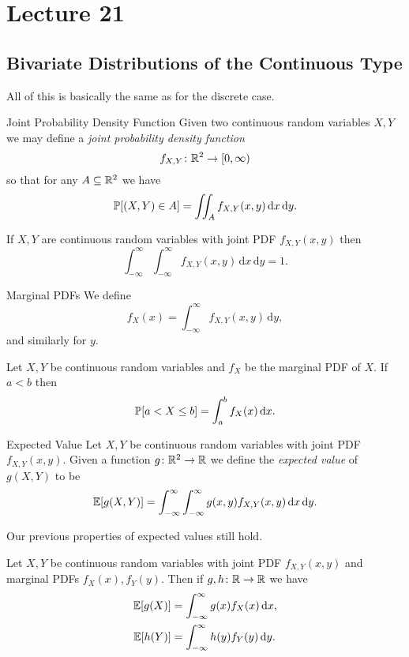 \documentclass[class=article, crop=false]{standalone}
\begin{document}
  \section{Lecture 21}
  \subsection{Bivariate Distributions of the Continuous Type}
  All of this is basically the same as for the discrete case.
  \begin{definition}{Joint Probability Density Function}
    Given two continuous random variables $X, Y$ we may define a \emph{joint probability density function}
    \[
      f_{X, Y}\colon \R^2\to [0, \infty)
    \]
    so that for any $A\sse \R^2$ we have
    \[
      \P[(X, Y)\in A] = \iint_A f_{X, Y}(x, y)\,\mathrm{d}x\,\mathrm{d}y.
    \]
  \end{definition}
  \begin{theorem}{}
    If $X, Y$ are continuous random variables with joint PDF $f_{X, Y}(x, y)$ then
    \[
      \int_{-\infty}^{\infty} \int_{-\infty}^{\infty} f_{X, Y}(x, y) \,\mathrm dx \,\mathrm dy = 1.
    \]
  \end{theorem}
  \begin{definition}{Marginal PDFs}
    We define
    \[
      f_X(x) = \int_{-\infty}^{\infty}f_{X, Y}(x, y) \,\mathrm dy,
    \]
    and similarly for $y$.
  \end{definition}
  \begin{theorem}{}
    Let $X, Y$ be continuous random variables and $f_X$ be the marginal PDF of $X$. If $a < b$ then
    \[
      \P[a < X \leq b] = \int_{a}^{b}f_X(x) \,\mathrm dx.
    \]
  \end{theorem}
  \begin{definition}{Expected Value}
    Let $X, Y$ be continuous random variables with joint PDF $f_{X, Y}(x, y)$. Given a function $g\colon \R^2\to \R$ we define the \emph{expected value} of $g(X, Y)$ to be
    \[
      \E[g(X, Y)] = \int_{-\infty}^{\infty} \int_{-\infty}^{\infty} g(x, y)f_{X, Y}(x, y) \,\mathrm dx \,\mathrm dy.
    \]
  \end{definition}
  Our previous properties of expected values still hold.
  \begin{theorem}{}
    Let $X, Y$ be continuous random variables with joint PDF $f_{X, Y}(x, y)$ and marginal PDFs $f_X(x), f_Y(y)$. Then if $g, h\colon \R\to \R$ we have
    \begin{align*}
      \E[g(X)] &= \int_{-\infty}^{\infty}g(x)f_X(x) \,\mathrm dx, \\
      \E[h(Y)] &= \int_{-\infty}^{\infty}h(y)f_Y(y) \,\mathrm dy.
    \end{align*}
  \end{theorem}
\end{document}
